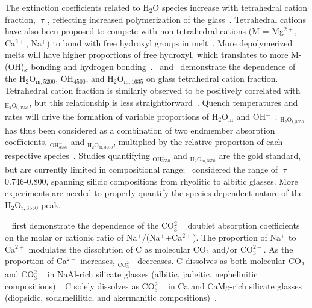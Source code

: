 \documentclass[draft]{agujournal2019}
\begin{document}
The extinction coefficients related to H$_2$O species increase with tetrahedral cation fraction, $\uptau$, reflecting increased polymerization of the glass~\cite{Stolper1982}. Tetrahedral cations have also been proposed to compete with non-tetrahedral cations (M = Mg$^{2+}$, Ca$^{2+}$, Na$^{+}$) to bond with free hydroxyl groups in melt~\cite{Mercieretal2010, Pandyaetal1992}. More depolymerized melts will have higher proportions of free hydroxyl, which translates to more M-(OH)$_x$ bonding and hydrogen bonding~\cite{Mercieretal2010, Xue2009}.~ and~ demonstrate the dependence of the \textepsilon${\mathrm{H_2O_{m, 5200}}}$, \textepsilon${\mathrm{OH^{-}_{4500}}}$, and \textepsilon${\mathrm{H_2O_{m, 1635}}}$ on glass tetrahedral cation fraction. Tetrahedral cation fraction is similarly observed to be positively correlated with \textepsilon$_{\mathrm{H_2O_{t, 3550}}}$, but this relationship is less straightforward~\cite{Mercieretal2010}. Quench temperatures and rates will drive the formation of variable proportions of H$_{2}$O$_{\mathrm{m}}$ and OH$^{-}$~\cite{SilverandStolper1989, Stolper1989}. \textepsilon$_{\mathrm{H_2O_{t, 3550}}}$ has thus been considered as a combination of two endmember absorption coefficients, \textepsilon$_{\mathrm{OH^{-}_{3550}}}$ and \textepsilon$_{\mathrm{H_2O_{m, 3550}}}$, multiplied by the relative proportion of each respective species~\cite{McIntoshetal2017, Newmanetal1986, Okumuraetal2003}. Studies quantifying \textepsilon$_{\mathrm{OH^{-}_{3550}}}$ and \textepsilon$_{\mathrm{H_2O_{m, 3550}}}$ are the gold standard, but are currently limited in compositional range;~ considered the range of $\uptau$ = 0.746-0.800, spanning silicic compositions from rhyolitic to albitic glasses. More experiments are needed to properly quantify the species-dependent nature of the $\mathrm{H_2O_{t, 3550}}$ peak. 

~ first demonstrate the dependence of the CO$_{3}^{2-}$ doublet absorption coefficients on the molar or cationic ratio of Na$^{+}$/(Na$^{+}$+Ca$^{2+}$). The proportion of Na$^{+}$ to Ca$^{2+}$ modulates the dissolution of C as molecular CO$_{2}$ and/or CO$_{3}^{2-}$. As the proportion of Ca$^{2+}$ increases, \textepsilon$_{\mathrm{CO_3^{2-}}}$ decreases. C dissolves as both molecular CO$_{2}$ and CO$_{3}^{2-}$ in NaAl-rich silicate glasses (albitic, jadeitic, nephelinitic compositions)~\cite{DixonandPan1995, FineandStolper1985, MysenandVirgo1980a, MysenandVirgo1980b}. C solely dissolves as CO$_{3}^{2-}$ in Ca and CaMg-rich silicate glasses (diopsidic, sodamelilitic, and akermanitic compositions)~\cite{DixonandPan1995, FineandStolper1986}.
\end{document}
